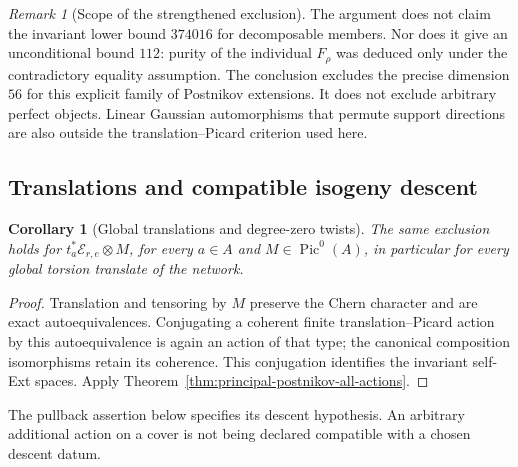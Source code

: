 \documentclass[11pt]{article}
\newtheorem{corollary}[theorem]{Corollary}
\theoremstyle{definition}
\theoremstyle{remark}
\newtheorem{remark}[theorem]{Remark}
\begin{document}
\begin{remark}[Scope of the strengthened exclusion]
The argument does not claim the invariant lower bound $374016$
for decomposable members.  Nor does it give an unconditional
bound $112$: purity of the individual $F_\rho$ was deduced only
under the contradictory equality assumption.  The conclusion
excludes the precise dimension $56$ for this explicit family
of Postnikov extensions.  It does not exclude arbitrary
perfect objects.  Linear Gaussian automorphisms that permute
support directions are also outside the translation--Picard
criterion used here.
\end{remark}


\subsection{Translations and compatible isogeny descent}

\begin{corollary}[Global translations and degree-zero twists]
\label{cor:principal-postnikov-translated}
The same exclusion holds for
$t_a^*\mathcal E_{r,e}\otimes M$, for every $a\in A$ and
$M\in\operatorname{Pic}^0(A)$, in particular for every global
torsion translate of the network.
\end{corollary}

\begin{proof}
Translation and tensoring by $M$ preserve the Chern character
and are exact autoequivalences.  Conjugating a coherent finite
translation--Picard action by this autoequivalence is again an
action of that type; the canonical composition isomorphisms
retain its coherence.  This conjugation identifies the
invariant self-Ext spaces.  Apply
Theorem~\ref{thm:principal-postnikov-all-actions}.
\end{proof}

The pullback assertion below specifies its descent hypothesis.
An arbitrary additional action on a cover is not being declared
compatible with a chosen descent datum.
\end{document}

